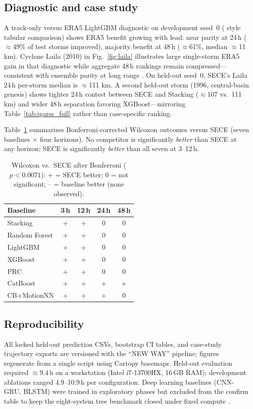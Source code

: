\documentclass[conference]{IEEEtran}
\newcommand{\sece}{SECE}
\newcommand{\era}{ERA5}
\newcommand{\km}{\,km}
\newcommand{\bonf}{0.0071}
\begin{document}
\subsection{Diagnostic and case study}
A track-only versus \era{} LightGBM diagnostic on development seed~0 (\cite{grinsztajn2022} style tabular comparison) shows \era{} benefit growing with lead: near parity at 24\,h ($\approx$49\% of test storms improved), majority benefit at 48\,h ($\approx$61\%, median $\approx$11\,\km{}).
Cyclone Laila (2010) in Fig.~\ref{fig:laila} illustrates large single-storm \era{} gain in that diagnostic while aggregate 48\,h rankings remain compressed---consistent with ensemble parity at long range \cite{ritchie2014,wu2018}.
On held-out seed~0, \sece{}'s Laila 24\,h per-storm median is $\approx$111\,\km{}.
A second held-out storm (1996, central-basin genesis) shows tighter 24\,h contest between \sece{} and Stacking ($\approx$107 vs.\ 111\,\km{}) and wider 48\,h separation favoring XGBoost---mirroring Table~\ref{tab:igarss_full} rather than case-specific ranking.

Table~\ref{tab:sig} summarizes Bonferroni-corrected Wilcoxon outcomes versus \sece{} (seven baselines $\times$ four horizons).
No competitor is significantly \emph{better} than \sece{} at any horizon; \sece{} is significantly \emph{better} than all seven at 3--12\,h.

\begin{table}[t]
\caption{Wilcoxon vs.\ \sece{} after Bonferroni ($p<\bonf$): + = \sece{} better; 0 = not significant; -- = baseline better (none observed).}
\label{tab:sig}
\centering
\scriptsize
\begin{tabular}{@{}lcccc@{}}
\toprule
Baseline & 3\,h & 12\,h & 24\,h & 48\,h \\
\midrule
Stacking & + & + & 0 & 0 \\
Random Forest & + & + & 0 & 0 \\
LightGBM & + & + & 0 & 0 \\
XGBoost & + & + & 0 & 0 \\
PRC & + & + & 0 & 0 \\
CatBoost & + & + & + & + \\
CB+MotionNN & + & + & + & 0 \\
\bottomrule
\end{tabular}
\end{table}

\subsection{Reproducibility}
All locked held-out prediction CSVs, bootstrap CI tables, and case-study trajectory exports are versioned with the ``NEW WAY'' pipeline; figures regenerate from a single script using Cartopy basemaps.
Held-out evaluation required $\approx$9.4\,h on a workstation (Intel i7-13700HX, 16\,GB RAM); development ablations ranged 4.9--10.9\,h per configuration.
Deep learning baselines (CNN-GRU, BLSTM) were trained in exploratory phases but excluded from the confirm table to keep the eight-system tree benchmark closed under fixed compute \cite{liu2020,chen2020,reichstein2019}.
\end{document}
